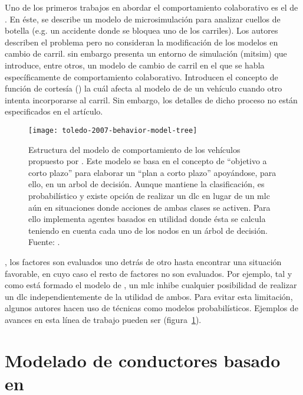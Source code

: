 Uno de los primeros trabajos en abordar el comportamiento colaborativo es el de \cite{Fritzsche1994}. En éste, se describe un modelo de microsimulación para analizar cuellos de botella (e.g. un accidente donde se bloquea uno de los carriles). Los autores describen el problema pero no consideran la modificación de los modelos en cambio de carril. \cite{Yang1996} sin embargo presenta un entorno de simulación (\gls{mitsim}) que introduce, entre otros, un modelo de cambio de carril en el que se habla específicamente de comportamiento colaborativo. Introducen el concepto de función de cortesía (\textit{}) la cuál afecta al modelo de \textit{} de un vehículo cuando otro intenta incorporarse al carril. Sin embargo, los detalles de dicho proceso no están especificados en el artículo.

\begin{figure}
	\texttt{[image: toledo-2007-behavior-model-tree]}
	\caption{Estructura del modelo de comportamiento de los vehículos propuesto por \cite{Toledo2007}. Este modelo se basa en el concepto de \enquote{objetivo a corto plazo} para elaborar un \enquote{plan a corto plazo} apoyándose, para ello, en un arbol de decisión. Aunque mantiene la clasificación, es probabilístico y existe opción de realizar un \gls{dlc} en lugar de un \gls{mlc} aún en situaciones donde acciones de ambas clases se activen. Para ello implementa agentes basados en utilidad donde ésta se calcula teniendo en cuenta cada uno de los nodos en un árbol de decisión. Fuente: \cite{Toledo2007}.}
	\label{fig:toledo-2007-behavior-model-tree}
\end{figure}

, los factores son evaluados uno detrás de otro hasta encontrar una situación favorable, en cuyo caso el resto de factores no son evaluados. Por ejemplo, tal y como está formado el modelo de \cite{Hidas2002}, un \gls{mlc} inhibe cualquier posibilidad de realizar un \gls{dlc} independientemente de la utilidad de ambos. Para evitar esta limitación, algunos autores hacen uso de técnicas como modelos probabilísticos. Ejemplos de avances en esta línea de trabajo pueden ser \cite{Toledo2003, Toledo2007, Wei2000} (figura~\ref{fig:toledo-2007-behavior-model-tree}).

\section{Modelado de conductores basado en }

